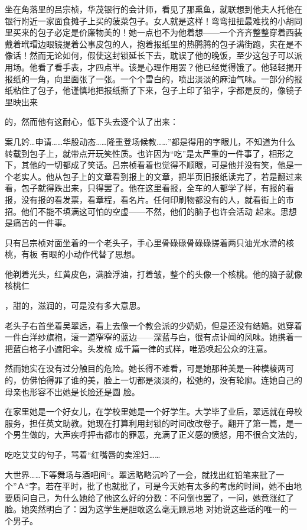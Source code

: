 \documentclass{article}
\begin{document}
    坐在角落里的吕宗桢，华茂银行的会计师，看见了那熏鱼，就联想到他夫人托他在银行附近一家面食摊子上买的菠菜包子。女人就是这样！弯弯扭扭最难找的小胡同里买来的包子必定是价廉物美的！她一点也不为他着想——一个齐齐整整穿着西装戴着玳瑁边眼镜提着公事皮包的人，抱着报纸里的热腾腾的包子满街跑，实在是不像话！然而无论如何，假使这封锁延长下去，耽误了他的晚饭，至少这包子可以派用场。他看了看手表，才四点半。该是心理作用罢？他已经觉得饿了。他轻轻揭开报纸的一角，向里面张了一张。一个个雪白的，喷出淡淡的麻油气味。一部分的报纸粘住了包子，他谨慎地把报纸撕了下来，包子上印了铅字，字都是反的，像镜子里映出来

\newpage
的，然而他有这耐心，低下头去逐个认了出来： 


    案几妗…申请……华股动态……隆重登场候教……”都是得用的字眼儿，不知道为什么转载到包子上，就带点开玩笑性质。也许因为“吃”是太严重的一件事了，相形之下，其他的一切都成了笑话。吕宗桢看着也觉得不顺眼，可是他并没有笑，他是一个老实人。他从包子上的文章看到报上的文章，把半页旧报纸读完了，若是翻过来看，包子就得跌出来，只得罢了。他在这里看报，全车的人都学了样，有报的看报，没有报的看发票，看章程，看名片。任何印刷物都没有的人，就看街上的市招。他们不能不填满这可怕的空虚——不然，他们的脑子也许会活动
起来。思想是痛苦的一件事。 

    只有吕宗桢对面坐着的一个老头子，手心里骨碌碌骨碌碌搓着两只油光水滑的核桃，有板
有眼的小动作代替了思想。 

    他剃着光头，红黄皮色，满脸浮油，打着皱，整个的头像一个核桃。他的脑子就像核桃仁
\newpage

，甜的，滋润的，可是没有多大意思。 

    老头子右首坐着吴翠远，看上去像一个教会派的少奶奶，但是还没有结婚。她穿着一件白洋纱旗袍，滚一道窄窄的蓝边——深蓝与白，很有点讣闻的风味。她携着一把蓝白格子小遮阳伞。头发梳
成千篇一律的式样，唯恐唤起公众的注意。 

    然而她实在没有过分触目的危险。她长得不难看，可是她那种美是一种模棱两可的，仿佛怕得罪了谁的美，脸上一切都是淡淡的，松弛的，没有轮廓。连她自己的母亲也形容不出她是长脸还是圆
脸。 


    在家里她是一个好女儿，在学校里她是一个好学生。大学毕了业后，翠远就在母校服务，担任英文助教。她现在打算利用封锁的时间改改卷子。翻开了第一篇，是一个男生做的，大声疾呼抨击都市的罪恶，充满了正义感的愤怒，用不很合文法的，

\newpage
吃吃艾艾的句子，骂着“红嘴唇的卖淫妇…… 

    大世界……下等舞场与酒吧间“。翠远略略沉吟了一会，就找出红铅笔来批了一个”Ａ“字。若在平时，批了也就批了，可是今天她有太多的考虑的时间，她不由地要质问自己，为什么她给了他这么好的分数：不问倒也罢了，一问，她竟涨红了脸。她突然明白了：因为这学生是胆敢这么毫无顾忌地
对她说这些话的唯一的一个男子。 
\end{document}
